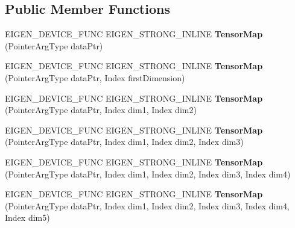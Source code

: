 \subsection*{Public Member Functions}
\begin{DoxyCompactItemize}
\item 
\mbox{\label{class_eigen_1_1_tensor_map_a1ff87b67a4c8bb91713005ca6081b331}} 
E\+I\+G\+E\+N\+\_\+\+D\+E\+V\+I\+C\+E\+\_\+\+F\+U\+NC E\+I\+G\+E\+N\+\_\+\+S\+T\+R\+O\+N\+G\+\_\+\+I\+N\+L\+I\+NE {\bfseries Tensor\+Map} (Pointer\+Arg\+Type data\+Ptr)
\item 
\mbox{\label{class_eigen_1_1_tensor_map_ada30a3291f1111741e7aeda07e0d8a70}} 
E\+I\+G\+E\+N\+\_\+\+D\+E\+V\+I\+C\+E\+\_\+\+F\+U\+NC E\+I\+G\+E\+N\+\_\+\+S\+T\+R\+O\+N\+G\+\_\+\+I\+N\+L\+I\+NE {\bfseries Tensor\+Map} (Pointer\+Arg\+Type data\+Ptr, Index first\+Dimension)
\item 
\mbox{\label{class_eigen_1_1_tensor_map_a8e09bf0ceb0091cbbd2eafd242f12b98}} 
E\+I\+G\+E\+N\+\_\+\+D\+E\+V\+I\+C\+E\+\_\+\+F\+U\+NC E\+I\+G\+E\+N\+\_\+\+S\+T\+R\+O\+N\+G\+\_\+\+I\+N\+L\+I\+NE {\bfseries Tensor\+Map} (Pointer\+Arg\+Type data\+Ptr, Index dim1, Index dim2)
\item 
\mbox{\label{class_eigen_1_1_tensor_map_a0473e1dd49ac72e9a59d718309ece71f}} 
E\+I\+G\+E\+N\+\_\+\+D\+E\+V\+I\+C\+E\+\_\+\+F\+U\+NC E\+I\+G\+E\+N\+\_\+\+S\+T\+R\+O\+N\+G\+\_\+\+I\+N\+L\+I\+NE {\bfseries Tensor\+Map} (Pointer\+Arg\+Type data\+Ptr, Index dim1, Index dim2, Index dim3)
\item 
\mbox{\label{class_eigen_1_1_tensor_map_a3a0533faf20086dafcde3640fd6b1582}} 
E\+I\+G\+E\+N\+\_\+\+D\+E\+V\+I\+C\+E\+\_\+\+F\+U\+NC E\+I\+G\+E\+N\+\_\+\+S\+T\+R\+O\+N\+G\+\_\+\+I\+N\+L\+I\+NE {\bfseries Tensor\+Map} (Pointer\+Arg\+Type data\+Ptr, Index dim1, Index dim2, Index dim3, Index dim4)
\item 
\mbox{\label{class_eigen_1_1_tensor_map_a84f22ff9a1b3dc5ec4230c7cb7c34f5c}} 
E\+I\+G\+E\+N\+\_\+\+D\+E\+V\+I\+C\+E\+\_\+\+F\+U\+NC E\+I\+G\+E\+N\+\_\+\+S\+T\+R\+O\+N\+G\+\_\+\+I\+N\+L\+I\+NE {\bfseries Tensor\+Map} (Pointer\+Arg\+Type data\+Ptr, Index dim1, Index dim2, Index dim3, Index dim4, Index dim5)

\end{DoxyCompactItemize}
